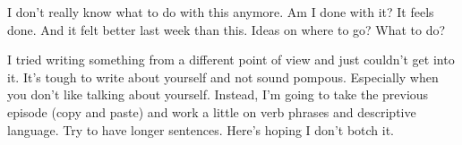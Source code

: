 I don't really know what to do with this anymore. Am I done with it? It feels done. And it felt better last week than this. Ideas on where to go? What to do?

I tried writing something from a different point of view and just couldn't get into it. It's tough to write about yourself and not sound pompous. Especially when you don't like talking about yourself. Instead, I'm going to take the previous episode (copy and paste) and work a little on verb phrases and descriptive language. Try to have longer sentences. Here's hoping I don't botch it.
